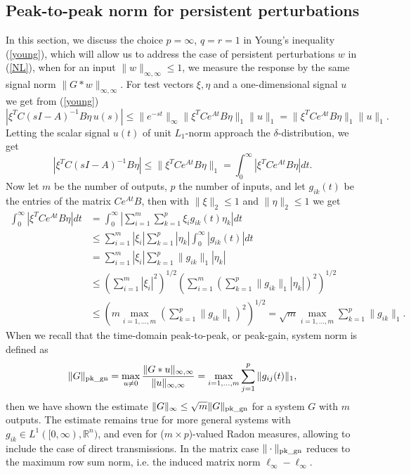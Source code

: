 \documentclass[12pt, a4paper,reqno]{amsart}
\theoremstyle{definition}
\begin{document}
\subsection{Peak-to-peak norm for persistent perturbations\label{sect-Persistent}}
In this section, we discuss the choice
$p=\infty$, $q=r=1$ in Young's inequality (\ref{young}), which will allow us to address the case of persistent perturbations
$w$ in (\ref{NL}), when for an input $\|w\|_{\infty,\infty} \leq 1$, we measure the response by the same signal norm $\|G\ast w\|_{\infty,\infty}$.
%
For test vectors $\xi,\eta$ and a one-dimensional signal $u$
we get from (\ref{young})
$$
|\xi^TC (sI-A)^{-1}B\eta \, u(s)| \leq \|e^{-st}\|_\infty \|\xi^TCe^{At}B\eta\|_1 \|u\|_1 =   \|\xi^TCe^{At}B\eta\|_1 \|u\|_1.$$
Letting   the scalar
signal $u(t)$ of unit $L_1$-norm approach the $\delta$-distribution,
we get
$$
|\xi^T C(sI-A)^{-1} B\eta| \leq \|\xi^TCe^{At}B\eta\|_1 = \int_0^\infty |\xi^TCe^{At}B\eta| dt.
$$
Now let $m$ be the number of outputs, $p$ the number of inputs, and let $g_{ik}(t)$ be the entries of the matrix
$Ce^{At}B$, then with $\|\xi\|_2 \leq 1$ and $\|\eta\|_2 \leq 1$ we get
\begin{align*}
\int_0^\infty |\xi^TCe^{At}B\eta| dt &= \int_0^\infty\left| \sum_{i=1}^m \sum_{k=1}^p \xi_i g_{ik}(t) \eta_k \right| dt\\
&\leq \sum_{i=1}^m |\xi_i| \sum_{k=1}^p|\eta_k|  \int_0^\infty | g_{ik}(t)|  dt  \\
&= \sum_{i=1}^m |\xi_i| \sum_{k=1}^p \| g_{ik}\|_1   |\eta_k| \\
&\leq \left(\sum_{i=1}^m |\xi_i|^2\right)^{1/2} \left( \sum_{i=1}^m  \left(\sum_{k=1}^p \|g_{ik}\|_1 |\eta_k|\right)^2\right)^{1/2}\\
&\leq \left( m \max_{i=1,\dots,m} \left(\sum_{k=1}^p \|g_{ik}\|_1\right)^2\right)^{1/2} = \sqrt{m}  \max_{i=1,\dots,m} \sum_{k=1}^p \|g_{ik}\|_1.
\end{align*}
When we recall that
the time-domain peak-to-peak, or peak-gain, system norm is defined as
$$
\|G\|_{\rm pk\_gn} = \max_{u\not=0} \frac{\|G\ast u\|_{\infty,\infty}}{\|u\|_{\infty,\infty}}= \max_{i=1,\dots,m} \sum_{j=1}^p \|g_{ij}(t)\|_1,
$$
then
we have shown the estimate $\|G\|_\infty \leq \sqrt{m} \|G\|_{\rm pk\_gn}$ for a system $G$ with $m$ outputs.  
The estimate remains true for more general systems with $g_{ik} \in L^1([0,\infty),\mathbb R^n)$, and even for 
($m \times p$)-valued Radon measures, allowing to include the case of direct transmissions. In the matrix case $\|\cdot\|_{\rm pk\_gn}$
reduces to the maximum row sum norm, i.e. the induced matrix norm $\ell_\infty-\ell_\infty$.
\end{document}
